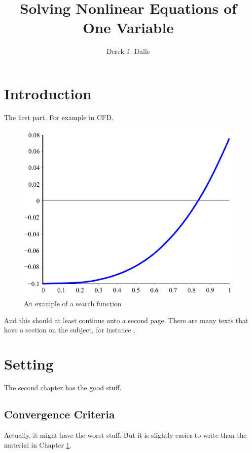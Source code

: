\documentclass[thesis]{./tex/thesis-umich}
\title{Solving Nonlinear Equations of One Variable}
\author{Derek J. Dalle}
\begin{document}
\chapter{Introduction}   \label{chap:intro}
The first part.  For example in \ac{CFD}.

\begin{figure}
 \begin{center}
  \includegraphics[scale=1]{./pics/f1_plain.pdf}
 \end{center}
 \caption{ \label{fig:fn:1}
  An example of a search function}
\end{figure}

\newpage

And this should at least continue onto a second page.  There are many texts that have a section on the subject, for instance \cite{chapra:2002:numerics}.

\chapter{Setting}
The second chapter has the good stuff.

\section{Convergence Criteria}
Actually, it might have the worst stuff.  But it is slightly easier to write than the material in Chapter \ref{chap:intro}.
\end{document}
